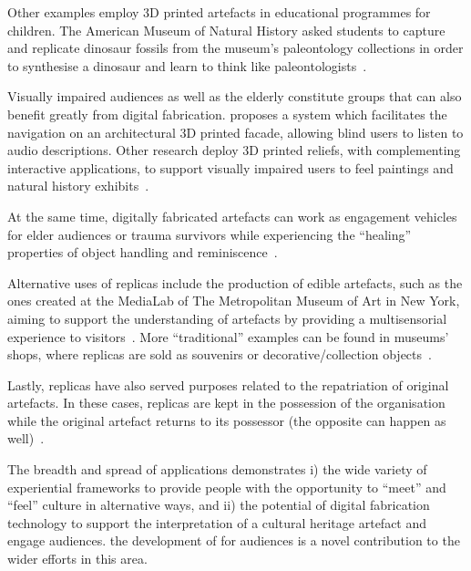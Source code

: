 \documentclass[acmlarge,screen,dvipsnames]{acmart}
\begin{document}
Other examples employ 3D printed artefacts in educational programmes
for children. The American Museum of Natural History asked students to
capture and replicate dinosaur fossils from the museum's paleontology
collections in order to synthesise a dinosaur and learn to think like
paleontologists~\cite{AMNH2013}. 

Visually impaired audiences as well as the elderly constitute groups
that can also benefit greatly from digital fabrication. \cite{DAgnano2015} proposes a system which
facilitates the navigation on an architectural 3D printed facade,
allowing blind users to listen to audio descriptions. Other research deploy 
3D printed reliefs, with complementing interactive
applications, to support visually impaired users to feel paintings and
natural history exhibits~\cite{Reichinger2016a,Samaroudi2017}.

At the same time, digitally fabricated artefacts can work as
engagement vehicles for elder audiences or trauma survivors while
experiencing the ``healing'' properties of object handling and
reminiscence~\cite{PleaseTouch2016}.

Alternative uses of replicas include the production of edible
artefacts, such as the ones created at the MediaLab of The
Metropolitan Museum of Art in New York, aiming to support the
understanding of artefacts by providing a multisensorial experience to
visitors~\cite{Tang2015}. More ``traditional'' examples can be found
in museums' shops, where replicas are sold as souvenirs or
decorative/collection objects~\cite{Young2017}.

Lastly, replicas have also served purposes related to the repatriation
of original artefacts. In these cases, replicas are kept in the
possession of the organisation while the original artefact returns to
its possessor (the opposite can happen as well)~\cite{Hollinger2013}.
 
The breadth and spread of applications demonstrates i) the wide
variety of experiential frameworks to provide people with the
opportunity to ``meet'' and ``feel'' culture in alternative ways, and
ii) the potential of digital fabrication technology to support the
interpretation of a cultural heritage artefact and engage audiences.  the development of
  for audiences is a novel contribution to
the wider efforts in this area.
\end{document}
